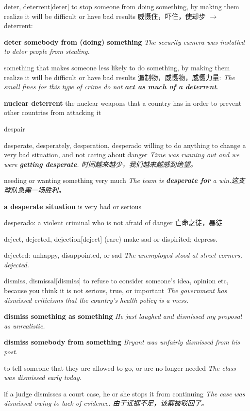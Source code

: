 \begin{DefWord}{deter, deterrent}[deter]
    to stop someone from doing something, by making them realize it will be difficult or have bad results 威慑住，吓住，使却步 $\rightarrow$  deterrent:

    \textbf{deter somebody from (doing) something}
    \textit{The security camera was installed to deter people from stealing.}

    something that makes someone less likely to do something, by making them realize it will be difficult or have bad results 遏制物，威慑物，威慑力量:
    \textit{The small fines for this type of crime do not \textbf{act as much of a deterrent}.}

    \textbf{nuclear deterrent} the nuclear weapons that a country has in order to prevent other countries from attacking it
\end{DefWord}

\begin{DefWord}{despair}
\end{DefWord}

\begin{DefWord}{desperate, desperately, desperation, desperado}
    willing to do anything to change a very bad situation, and not caring about danger
    \textit{Time was running out and we were \textbf{getting desperate}. 时间越来越少，我们越来越感到绝望。 }

    needing or wanting something very much
    \textit{The team is \textbf{desperate for} a win.这支球队急需一场胜利。 }

    \textbf{a desperate situation} is very bad or serious

    desperado:  a violent criminal who is not afraid of danger 亡命之徒，暴徒
\end{DefWord}

\begin{DefWord}{deject, dejected, dejection}[deject]
    (rare) make sad or dispirited; depress.

    dejected: unhappy, disappointed, or sad
    \textit{The unemployed stood at street corners, dejected.}
\end{DefWord}

\begin{DefWord}{dismiss, dismissal}[dismiss]
    to refuse to consider someone's idea, opinion etc, because you think it is not serious, true, or important
    \textit{The government has dismissed criticisms that the country's health policy is a mess.}

    \textbf{dismiss something as something}
    \textit{He just laughed and dismissed my proposal as unrealistic.}

    \textbf{dismiss somebody from something}
    \textit{ Bryant was unfairly dismissed from his post.}

    to tell someone that they are allowed to go, or are no longer needed
    \textit{The class was dismissed early today.}

    if a judge dismisses a court case, he or she stops it from continuing
    \textit{The case was dismissed owing to lack of evidence. 由于证据不足，该案被驳回了。 }
\end{DefWord}

